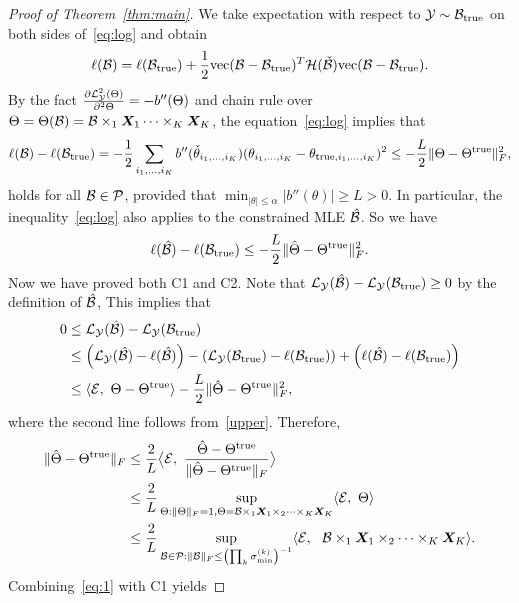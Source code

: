 \documentclass[12pt]{article}
\theoremstyle{definition}
\theoremstyle{definition}
\begin{document}
\begin{proof}[Proof of Theorem~\ref{thm:main}]
We take expectation with respect to $\mathcal{Y}\sim \mathcal{B}_{\textup{true}}$ on both sides of~\eqref{eq:log} and obtain
\begin{equation}\label{eq:log}
\ell(\mathcal{B})=\ell(\mathcal{B}_{\textup{true}})+{1\over 2}\text{vec}(\mathcal{B}-\mathcal{B}_{\textup{true}})^T \mathcal{H}(\check {\mathcal{B}})\text{vec}(\mathcal{B}-\mathcal{B}_{\textup{true}}).
\end{equation}
By the fact ${\partial \mathcal{L}_{\mathcal{Y}}^2(\Theta)\over \partial^2 \Theta}=-b''(\Theta)$ and chain rule over $\Theta=\Theta(\mathcal{B})=\mathcal{B}\times_1\bm X_1\cdots\times_K\bm X_K$, the equation~\eqref{eq:log} implies that 
\begin{equation}\label{eq:logB}
\ell(\mathcal{B})-\ell(\mathcal{B}_{\textup{true}})=-{1\over 2}\sum_{i_1,\ldots,i_K}b''(\check \theta_{i_1,\ldots,i_K}) (\theta_{i_1,\ldots,i_K}-\theta_{\text{true},i_1,\ldots,i_K})^2 \leq -{L \over 2}\lVert\Theta-\Theta^{\text{true}}\rVert_F^2,
\end{equation}
holds for all $\mathcal{B}\in\mathcal{P}$, provided that $\min_{|\theta|\leq \alpha}|b''(\theta)|\geq L>0$. In particular, the inequality~\eqref{eq:log} also applies to the constrained MLE $\hat {\mathcal{B}}$. So we have
\begin{equation}\label{upper}
\ell(\hat {\mathcal{B}})-\ell(\mathcal{B}_{\textup{true}})\leq -{L \over 2}\lVert\hat \Theta-\Theta^{\text{true}}\rVert_F^2.
\end{equation}
Now we have proved both C1 and C2. Note that $\mathcal{L}_{\mathcal{Y}}(\hat {\mathcal{B}})- \mathcal{L}_{\mathcal{Y}}(\mathcal{B}_{\textup{true}})\geq 0$ by the definition of $\hat {\mathcal{B}}$, This implies that
\begin{align}
0&\leq \mathcal{L}_{\mathcal{Y}}(\hat {\mathcal{B}})- \mathcal{L}_{\mathcal{Y}}(\mathcal{B}_{\textup{true}}) \\
&\leq \left(\mathcal{L}_{\mathcal{Y}}(\hat {\mathcal{B}})-\ell(\hat {\mathcal{B}})\right)-\left( \mathcal{L}_{\mathcal{Y}}(\mathcal{B}_{\textup{true}})-\ell(\mathcal{B}_{\textup{true}})\right)+\left(\ell(\hat {\mathcal{B}})-\ell(\mathcal{B}_{\textup{true}})\right)\\
&\leq \langle\mathcal{E},\ \Theta-\Theta^{\text{true}}    \rangle -{L\over 2}\lVert\hat \Theta-\Theta^{\text{true}}\rVert_F^2,
\end{align}
where the second line follows from~\eqref{upper}. Therefore,
\begin{align}\label{eq:1}
\FnormSize{}{\hat \Theta-\trueT}&\leq {2\over L}\big\langle \tE,\ {\hat \Theta -\trueT \over \FnormSize{}{\hat \Theta-\trueT}} \big\rangle\notag \\
&\leq {2\over L}\sup_{\Theta: \FnormSize{}{\Theta}=1, \Theta=\tB\times_1\mX_1\times_2\cdots\times_K \mX_K}\langle \tE,\ \Theta \rangle\notag \\
&\leq {2\over L}\sup_{\tB\in\tP: \FnormSize{}{\tB}\leq \left(\prod_k \sigma_{\min}^{(k)}\right)^{-1}} \langle \tE,\ \ \tB\times_1\mX_1\times_2\cdots\times_K\mX_K\rangle.
\end{align}
Combining~\eqref{eq:1} with C1 yields 

\end{proof}
\end{document}
